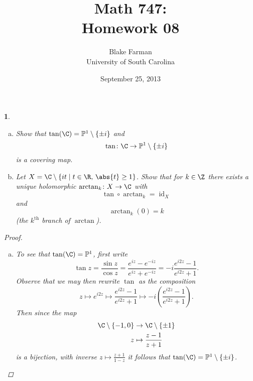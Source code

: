 \documentclass[10pt]{amsart}
\author{Blake Farman\\University of South Carolina}
\title{Math 747:\\Homework 08}
\date{September 25, 2013}
\begin{document}
\maketitle

\providecommand{\p}{\mathfrak{p}}
\providecommand{\m}{\mathfrak{m}}

\newtheorem{thm}{}
\newtheorem{lem}{Lemma}
\newtheorem{prop}{Proposition}
\theoremstyle{definition}
\newtheorem{defn}{Definition}[thm]

\newcommand{\A}{\mathbb{A}}

\begin{thm}
  \begin{enumerate}[(a)]
  \item
    Show that $\tan(\C) = \mathbb{P}^1 \setminus \{\pm i\}$ and
    $$\tan \colon \C \rightarrow \mathbb{P}^1 \setminus \{\pm i\}$$
    is a covering map.
  \item
    Let $X = \C \setminus \left\{it \;\middle\vert\; t \in \R,\, \abs{t} \geq 1\right\}$.
    Show that for $k \in \Z$ there exists a unique holomorphic $\arctan_k \colon X \rightarrow \C$ with
    $$\tan \circ \arctan_k = \operatorname{id}_X$$
    and
    $$\arctan_k(0) = k$$
    (the $k^\text{th}$ branch of $\arctan$).
  \end{enumerate}
  
  \begin{proof}
    \begin{enumerate}[(a)]
    \item
      To see that $\tan(\C) = \mathbb{P}^1$, first write
      \begin{equation}\label{1.1}
        \tan{z} = \frac{\sin{z}}{\cos{z}} = \frac{e^{iz} - e^{-iz}}{e^{iz} + e^{-iz}} = -i\frac{e^{i2z} - 1}{e^{i2z} + 1}.
      \end{equation}
      Observe that we may then rewrite $\tan$ as the composition
      $$z \mapsto e^{i2z} \mapsto \frac{e^{i2z} - 1}{e^{i2z} + 1} \mapsto -i\left(\frac{e^{i2z} - 1}{e^{i2z} + 1}\right).$$
      Then since the map
      \begin{align*}
        \C\setminus\{-1,0\} &\rightarrow \C\setminus\{\pm 1\}\\
        z &\mapsto \frac{z - 1}{z + 1}
      \end{align*}
      is a bijection, with inverse $z \mapsto \frac{z + 1}{1 - z}$ it follows that $\tan(\C) = \mathbb{P}^1 \setminus \{\pm i\}$.
      

\end{enumerate}
\end{proof}
\end{thm}
\end{document}
